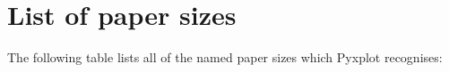 %
%
%
%
%



\chapter{List of paper sizes}
\label{ch:paper_sizes}

The following table lists all of the named paper sizes which Pyxplot recognises:


